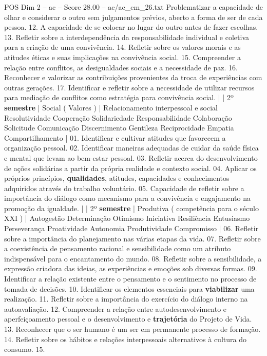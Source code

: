 \begin{textsample}{POS Dim 2 – ac – Score 28.00 – ac/ac\_em\_26.txt}
Problematizar a capacidade de olhar e considerar o outro sem julgamentos prévios, aberto a forma de ser de cada pessoa. 12.
A capacidade de se colocar no lugar do outro antes de fazer escolhas. 13.
Refletir sobre a interdependência da responsabilidade individual e coletiva para a criação de uma convivência. 14.
Refletir sobre os valores morais e as atitudes éticas e suas implicações na convivência social. 15.
Compreender a relação entre conflitos, as desigualdades sociais e a necessidade de paz. 16.
Reconhecer e valorizar as contribuições provenientes da troca de experiências com outras gerações. 17.
Identificar e refletir sobre a necessidade de utilizar recursos para mediação de conflitos como estratégia para convivência social. | | 2º \textbf{semestre} | Social ( Valores ) | Relacionamento interpessoal e social Resolutividade Cooperação Solidariedade Responsabilidade Colaboração Solicitude Comunicação Discernimento Gentileza Reciprocidade Empatia Compartilhamento | 01.
Identificar e cultivar atitudes que favorecem a organização pessoal. 02.
Identificar maneiras adequadas de cuidar da saúde física e mental que levam ao bem-estar pessoal. 03.
Refletir acerca do desenvolvimento de ações solidárias a partir da própria realidade e contexto social. 04.
Aplicar os próprios princípios, \textbf{qualidades}, atitudes, capacidades e conhecimentos adquiridos através do trabalho voluntário. 05.
Capacidade de refletir sobre a importância do diálogo como mecanismo para a convivência e engajamento na promoção da igualdade. | | 2º \textbf{semestre} | Produtiva ( competência para o século XXI ) | Autogestão Determinação Otimismo Iniciativa Resiliência Entusiasmo Perseverança Proatividade Autonomia Produtividade Compromisso | 06.
Refletir sobre a importância do planejamento nas várias etapas da vida. 07.
Refletir sobre a coexistência de pensamento racional e sensibilidade como um atributo indispensável para o encantamento do mundo. 08.
Refletir sobre a sensibilidade, a expressão criadora das ideias, as experiências e emoções sob diversas formas. 09.
Identificar a relação existente entre o pensamento e o sentimento no processo de tomada de decisões. 10.
Identificar os elementos essenciais para \textbf{viabilizar} uma realização. 11.
Refletir sobre a importância do exercício do diálogo interno na autoavaliação. 12.
Compreender a relação entre autodesenvolvimento e aperfeiçoamento pessoal e o desenvolvimento e \textbf{trajetória} do Projeto de Vida. 13.
Reconhecer que o ser humano é um ser em permanente processo de formação. 14.
Refletir sobre os hábitos e relações interpessoais alternativos à cultura do consumo. 15.

\end{textsample}

